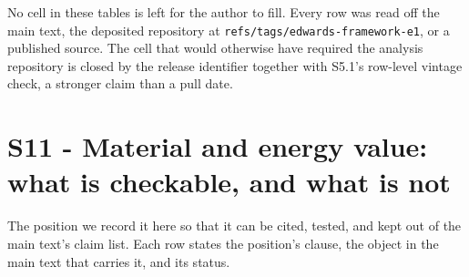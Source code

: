 \documentclass[11pt]{article}
\begin{document}
No cell in these tables is left for the author to fill. Every row was read off the main text, the deposited repository at \texttt{refs/\allowbreak{}tags/\allowbreak{}edwards-\allowbreak{}framework-\allowbreak{}e1}, or a published source. The cell that would otherwise have required the analysis repository is closed by the release identifier together with S5.1's row-level vintage check, a stronger claim than a pull date.

\section*{S11 - Material and energy value: what is checkable, and what is not}\label{s11---material-and-energy-value-what-is-checkable-and-what-is-not}

The position we record it here so that it can be cited, tested, and kept out of the main text's claim list. Each row states the position's clause, the object in the main text that carries it, and its status.
\end{document}
